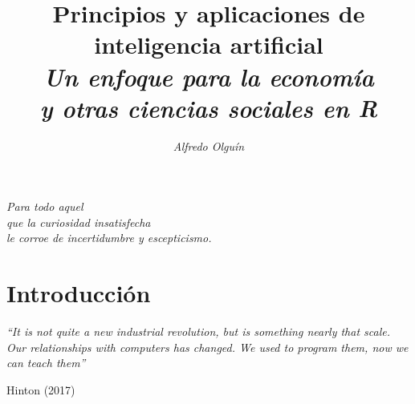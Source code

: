 \documentclass[letterpaper,12pt, spanish, oneside]{book} %
\begin{document}
\title{
	{\textbf{Principios y aplicaciones de inteligencia artificial}}\\	
\normalsize{\textit{Un enfoque para la economía \\  	y otras ciencias sociales en R}}
}
\author{\textit{Alfredo Olguín}}
\date{}

\maketitle




\textit{Para todo aquel \\
que la curiosidad insatisfecha \\ 
le corroe de incertidumbre 
y escepticismo. \\
}

\setcounter{tocdepth}{3} %
\tableofcontents



\chapter{Introducción}
\begin{flushright}
\textit{“It is not quite a new industrial revolution, but is something nearly that scale. Our relationships with computers has changed. We used to program them, now we can teach them”}

Hinton (2017)
\end{flushright}
\end{document}
